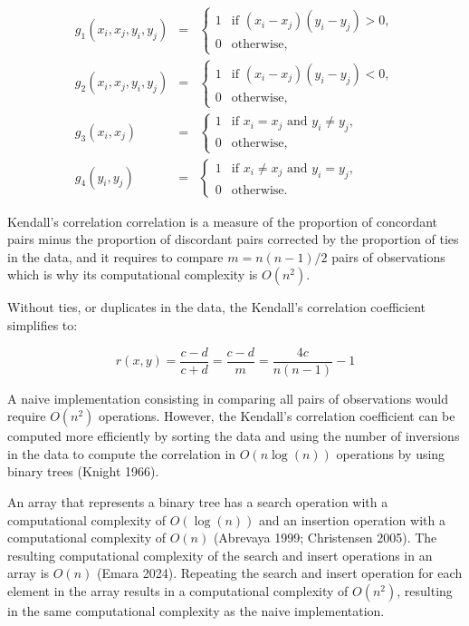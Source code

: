\documentclass[12pt]{article}
\begin{document}
\begin{eqnarray*}
g_1(x_i, x_j, y_i, y_j) &=& \begin{cases}
  1 & \text{if } (x_i - x_j)(y_i - y_j) > 0, \\
  0 & \text{otherwise},
\end{cases} \\
g_2(x_i, x_j, y_i, y_j) &=& \begin{cases}
  1 & \text{if } (x_i - x_j)(y_i - y_j) < 0, \\
  0 & \text{otherwise},
\end{cases} \\
g_3(x_i, x_j) &=& \begin{cases}
  1 & \text{if } x_i = x_j \text{ and } y_i \neq y_j, \\
  0 & \text{otherwise},
\end{cases} \\
g_4(y_i, y_j) &=& \begin{cases}
  1 & \text{if } x_i \neq x_j \text{ and } y_i = y_j, \\
  0 & \text{otherwise}.
\end{cases}
\end{eqnarray*}

Kendall's correlation correlation is a measure of the proportion of
concordant pairs minus the proportion of discordant pairs corrected by
the proportion of ties in the data, and it requires to compare
\(m = n(n - 1) / 2\) pairs of observations which is why its
computational complexity is \(O(n^2)\).

Without ties, or duplicates in the data, the Kendall's correlation
coefficient simplifies to:

\begin{equation*}
r(x,y) = \frac{c - d}{c + d} = 
 \frac{c - d}{m} =
 \frac{4c}{n(n - 1)} - 1
\end{equation*}

A naive implementation consisting in comparing all pairs of observations
would require \(O(n^2)\) operations. However, the Kendall's correlation
coefficient can be computed more efficiently by sorting the data and
using the number of inversions in the data to compute the correlation in
\(O(n \log(n))\) operations by using binary trees (Knight 1966).

An array that represents a binary tree has a search operation with a
computational complexity of \(O(\log(n))\) and an insertion operation
with a computational complexity of \(O(n)\) (Abrevaya 1999; Christensen
2005). The resulting computational complexity of the search and insert
operations in an array is \(O(n)\) (Emara 2024). Repeating the search
and insert operation for each element in the array results in a
computational complexity of \(O(n^2)\), resulting in the same
computational complexity as the naive implementation.
\end{document}

